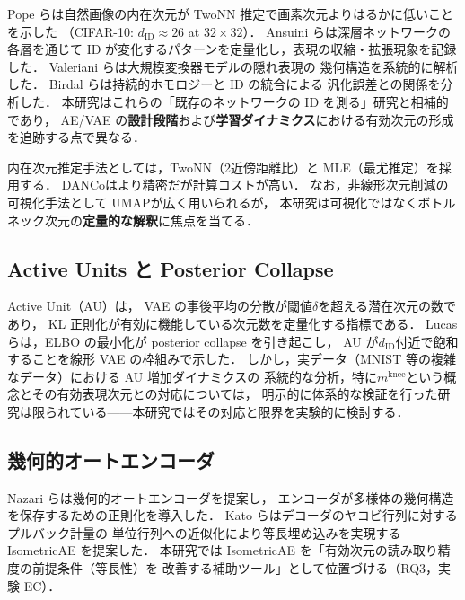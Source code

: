 \documentclass[11pt,a4paper]{jsarticle}
\newcommand{\mknee}{m^{\mathrm{knee}}}
\begin{document}
Pope ら\cite{pope2021intrinsic}は自然画像の内在次元が
TwoNN 推定で画素次元よりはるかに低いことを示した
（CIFAR-10: $d_\mathrm{ID} \approx 26$ at $32 \times 32$）．
Ansuini ら\cite{ansuini2019intrinsic}は深層ネットワークの各層を通じて
ID が変化するパターンを定量化し，表現の収縮・拡張現象を記録した．
Valeriani ら\cite{valeriani2023geometry}は大規模変換器モデルの隠れ表現の
幾何構造を系統的に解析した．
Birdal ら\cite{birdal2021intrinsic}は持続的ホモロジーと ID の統合による
汎化誤差との関係を分析した．
本研究はこれらの「既存のネットワークの ID を測る」研究と相補的であり，
AE/VAE の\textbf{設計段階}および\textbf{学習ダイナミクス}における有効次元の形成を追跡する点で異なる．

内在次元推定手法としては，TwoNN\cite{facco2017twonn}（2近傍距離比）と
MLE\cite{levina2005mle}（最尤推定）を採用する．
DANCo\cite{ceruti2014danco}はより精密だが計算コストが高い．
なお，非線形次元削減の可視化手法として UMAP\cite{mcinnes2018umap}が広く用いられるが，
本研究は可視化ではなくボトルネック次元の\textbf{定量的な解釈}に焦点を当てる．

\subsection{Active Units と Posterior Collapse}\label{sec:related_au}

Active Unit（AU）\cite{lucas2019elbo,higgins2017betavae}は，
VAE の事後平均の分散が閾値$\delta$を超える潜在次元の数であり，
KL 正則化が有効に機能している次元数を定量化する指標である．
Lucas ら\cite{lucas2019elbo}は，ELBO の最小化が posterior collapse を引き起こし，
AU が$d_{\mathrm{ID}}$付近で飽和することを線形 VAE の枠組みで示した．
しかし，実データ（MNIST 等の複雑なデータ）における AU 増加ダイナミクスの
系統的な分析，特に$\mknee$という概念とその有効表現次元との対応については，
明示的に体系的な検証を行った研究は限られている——本研究ではその対応と限界を実験的に検討する．

\subsection{幾何的オートエンコーダ}\label{sec:related_geo}

Nazari ら\cite{nazari2023geometric}は幾何的オートエンコーダを提案し，
エンコーダが多様体の幾何構造を保存するための正則化を導入した．
Kato ら\cite{kato2020rdae}はデコーダのヤコビ行列に対するプルバック計量の
単位行列への近似化により等長埋め込みを実現する IsometricAE を提案した．
本研究では IsometricAE を「有効次元の読み取り精度の前提条件（等長性）を
改善する補助ツール」として位置づける（RQ3，実験 EC）．
\end{document}
